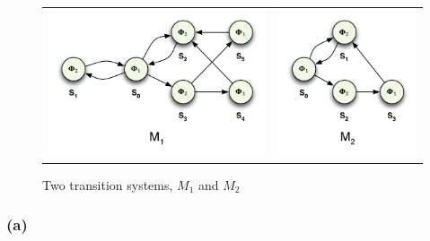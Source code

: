 \documentclass[12pt]{report}
\begin{document}
\begin{figure}[H]
	\centering
	\begin{tabular}{ l r }
		\includegraphics[scale=0.75]{../GFX/ExerciseFigure2-M1.pdf}
		& \includegraphics[scale=0.75]{../GFX/ExerciseFigure2-M2.pdf}
	\end{tabular}
	\caption{Two transition systems, $M_1$ and $M_2$}
\end{figure}

\subsubsection*{(a)}
\end{document}
